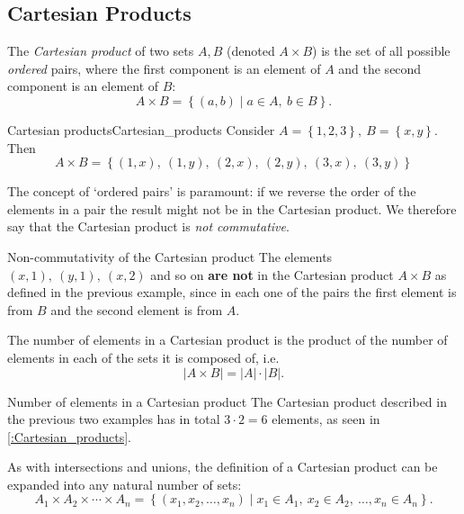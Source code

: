\subsection{Cartesian Products}
The \emph{Cartesian product} of two sets $A,B$ (denoted $A\times B$) is the set of all possible \emph{ordered} pairs, where the first component is an element of $A$ and the second component is an element of $B$:
\begin{equation}
	A\times B = \left\{ (a,b) \mid a\in A,\ b\in B \right\}.
	\label{eq:Cartesian_product}
\end{equation}

\begin{example}{Cartesian products}{Cartesian_products}
	Consider $A=\left\{ 1,2,3 \right\},\ B=\left\{ x, y \right\}$. Then
	\[
		A\times B = \left\{ \left( 1,x \right),\ \left( 1,y \right),\ \left( 2,x \right),\ \left( 2,y \right),\ \left( 3,x \right),\ \left( 3,y \right) \right\}
	\]
\end{example}

The concept of `ordered pairs' is paramount: if we reverse the order of the elements in a pair the result might not be in the Cartesian product. We therefore say that the Cartesian product is \emph{not commutative}.

\begin{example}{Non-commutativity of the Cartesian product}{}
	The elements $(x,1),\ (y,1),\ (x,2)$ and so on \textbf{are not} in the Cartesian product $A\times B$ as defined in the previous example, since in each one of the pairs the first element is from $B$ and the second element is from $A$.
\end{example}

The number of elements in a Cartesian product is the product of the number of elements in each of the sets it is composed of, i.e.
\begin{equation}
	|A\times B| = |A|\cdot|B|.
	\label{eq:number_of_elements_Cartesian_product}
\end{equation}

\begin{example}{Number of elements in a Cartesian product}{}
	The Cartesian product described in the previous two examples has in total $3\cdot2=6$ elements, as seen in \autoref{:Cartesian_products}.
\end{example}

As with intersections and unions, the definition of a Cartesian product can be expanded into any natural number of sets:
\begin{equation}
	A_{1}\times A_{2}\times \cdots \times A_{n} = \left\{ \left( x_{1},x_{2},\dots,x_{n} \right) \mid x_{1}\in A_{1},\ x_{2}\in A_{2},\ \dots, x_{n}\in A_{n} \right\}.
	\label{eq:Cartesian_product_multiple_sets}
\end{equation}

